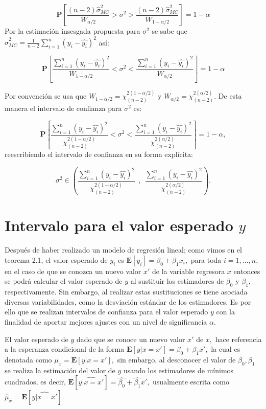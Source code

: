 \documentclass[
  a4paper,
  oneside,
  openany]{book}
\begin{document}
\[\mathbf{P}\left[\frac{(n-2)\hat{\sigma}^2_{MC}}{W_{\alpha/2}}>\sigma^2>\frac{(n-2)\hat{\sigma}^2_{MC}} {W_{1-\alpha/2}}\right]=1-\alpha\]
Por la estimación insesgada propuesta para \(\sigma^2\) se sabe que \(\hat{\sigma}^2_{MC}=\frac{1}{n-2}\sum_{i=1}^{n}(y_i-\hat{y_{i}})^2\) así:

\[\mathbf{P}\left[\frac{\sum_{i=1}^{n}(y_i-\hat{y_{i}})^2}{W_{1-\alpha/2}}<\sigma^2<\frac{\sum_{i=1}^{n}(y_i-\hat{y_{i}})^2} {W_{\alpha/2}}\right]=1-\alpha\]

Por convención se usa que \(W_{1-\alpha/2}=\chi^{2(1-\alpha/2)}_{(n-2)}\) y \(W_{\alpha/2}=\chi^{2(\alpha/2)}_{(n-2)}.\) De esta manera el intervalo de confianza para \(\sigma^2\) es:

\[\mathbf{P}\left[\frac{\sum_{i=1}^{n}(y_i-\hat{y_{i}})^2}{\chi^{2(1-\alpha/2)}_{(n-2)}}<\sigma^2<\frac{\sum_{i=1}^{n}(y_i-\hat{y_{i}})^2} {\chi^{2(\alpha/2)}_{(n-2)}}\right]=1-\alpha,\]
reescribiendo el intervalo de confianza en su forma explícita:

\[\sigma^2 \in \left( \frac{\sum_{i=1}^{n}(y_i-\hat{y_{i}})^2}{\chi^{2(1-\alpha/2)}_{(n-2)}} \ \ , \ \ \frac{\sum_{i=1}^{n}(y_i-\hat{y_{i}})^2} {\chi^{2(\alpha/2)}_{(n-2)}} \right).\]

\hypertarget{intervalo-para-el-valor-esperado-y}{%
\section{\texorpdfstring{Intervalo para el valor esperado \(y\)}{Intervalo para el valor esperado y}}\label{intervalo-para-el-valor-esperado-y}}

Después de haber realizado un modelo de regresión lineal; como vimos en el teorema 2.1, el valor esperado de \(y_{i}\) es \(\mathbf{E}[y_{i}]=\beta_{0}+\beta_{1}x_{i},\) para toda \(i=1,\ldots,n,\) en el caso de que se conozca un nuevo valor \(x'\) de la variable regresora \(x\) entonces se podrá calcular el valor esperado de \(y\) al sustituir los estimadores de \(\beta_{0}\) y \(\beta_{1},\) respectivamente. Sin embargo, al realizar estas sustituciones se tiene asociada diversas variabilidades, como la desviación estándar de los estimadores. Es por ello que se realizan intervalos de confianza para el valor esperado \(y\) con la finalidad de aportar mejores ajustes con un nivel de significancia \(\alpha.\)

El valor esperado de \(y\) dado que se conoce un nuevo valor \(x'\) de \(x,\) hace referencia a la esperanza condicional de la forma \(\mathbf{E}[y|x=x']=\beta_{0}+\beta_{1}x',\) la cual es denotada como \(\mu_{x}=\mathbf{E}[y|x=x' ],\) sin embargo, al desconocer el valor de \(\beta_{0},\beta_{1}\) se realiza la estimación del valor de \(y\) usando los estimadores de mínimos cuadrados, es decir, \(\mathbf{E}[\widehat{y|x=x'}]=\hat{\beta_{0}}+\hat{\beta_{1}}x',\) usualmente escrita como \(\hat{\mu}_{x}=\mathbf{E}[\widehat{y|x=x'}].\)
\end{document}

